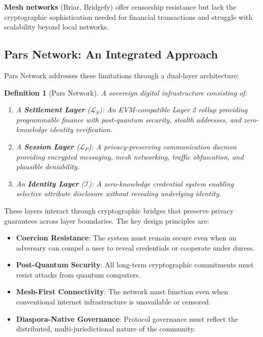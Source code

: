 \documentclass[11pt,a4paper,twocolumn]{article}
\newtheorem{definition}[theorem]{Definition}
\begin{document}
\textbf{Mesh networks} (Briar, Bridgefy) offer censorship resistance but lack the cryptographic sophistication needed for financial transactions and struggle with scalability beyond local networks.

\subsection{Pars Network: An Integrated Approach}

Pars Network addresses these limitations through a dual-layer architecture:

\begin{definition}[Pars Network]
A sovereign digital infrastructure consisting of:
\begin{enumerate}
  \item A \textbf{Settlement Layer} ($\mathcal{L}_S$): An EVM-compatible Layer 2 rollup providing programmable finance with post-quantum security, stealth addresses, and zero-knowledge identity verification.
  \item A \textbf{Session Layer} ($\mathcal{L}_P$): A privacy-preserving communication daemon providing encrypted messaging, mesh networking, traffic obfuscation, and plausible deniability.
  \item An \textbf{Identity Layer} ($\mathcal{I}$): A zero-knowledge credential system enabling selective attribute disclosure without revealing underlying identity.
\end{enumerate}
\end{definition}

These layers interact through cryptographic bridges that preserve privacy guarantees across layer boundaries. The key design principles are:

\begin{itemize}[leftmargin=*]
  \item \textbf{Coercion Resistance}: The system must remain secure even when an adversary can compel a user to reveal credentials or cooperate under duress.
  \item \textbf{Post-Quantum Security}: All long-term cryptographic commitments must resist attacks from quantum computers.
  \item \textbf{Mesh-First Connectivity}: The network must function even when conventional internet infrastructure is unavailable or censored.
  \item \textbf{Diaspora-Native Governance}: Protocol governance must reflect the distributed, multi-jurisdictional nature of the community.
\end{itemize}
\end{document}
